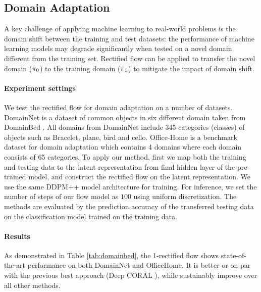 \subsection{Domain Adaptation} 
A key challenge of applying machine learning  to  real-world problems is the domain shift between the training and test datasets: the performance of machine learning models may degrade significantly 
when tested on a novel domain different from the training set.  
Rectified flow can be applied to transfer the novel domain (${\pi}_0$) to the training domain (${\pi}_1$) to mitigate the impact of domain shift. 

\paragraph{Experiment settings} We test the rectified flow for domain adaptation on 
a number of datasets. 
DomainNet \citep{peng2019domainnet} is a dataset of common objects in six different domain taken from DomainBed  \citep{gulrajani2020search}. %
All domains  from DomainNet  include 345 categories (classes) of objects such as Bracelet, plane, bird and cello. 
Office-Home \citep{venkateswara2017officehome} is a benchmark dataset for domain adaptation which contains 4 domains where each domain consists of 65 categories. 
To apply our method, 
first we map both the training and testing data 
to the latent representation from final hidden layer of the pre-trained model, and construct the rectified flow on the latent representation. 
We use the same DDPM++ model architecture %
for training. %
For inference, we set the number of steps of our flow model as $100$ using uniform discretization.
The methods are evaluated by the prediction accuracy of the transferred testing data 
on the classification model trained on the training data. 

\paragraph{Results}
As demonstrated in Table \ref{tab:domainbed}, 
the 1-rectified flow shows  
state-of-the-art performance 
on both DomainNet and OfficeHome. 
It is better or on  par with 
the previous best approach (Deep CORAL \citep{sun2016coral}), 
while sustainably improve over all other methods.



